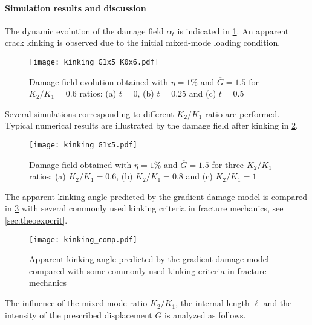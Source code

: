\paragraph{Simulation results and discussion} The dynamic evolution of the damage field $\alpha_t$ is indicated in \cref{fig:kinking_t}. An apparent crack kinking is observed due to the initial mixed-mode loading condition.
\begin{figure}[htbp]
\centering
\texttt{[image: kinking\_G1x5\_K0x6.pdf]}
\caption{Damage field evolution obtained with $\eta=1\%$ and $\overline{G}=1.5$ for $K_2/K_1=0.6$ ratios: (a) $t=0$, (b) $t=0.25$ and (c) $t=0.5$} \label{fig:kinking_t}
\end{figure}
Several simulations corresponding to different $K_2/K_1$ ratio are performed. Typical numerical results are illustrated by the damage field after kinking in \cref{fig:kinking_k2k1}.
\begin{figure}[htbp]
\centering
\texttt{[image: kinking\_G1x5.pdf]}
\caption{Damage field obtained with $\eta=1\%$ and $\overline{G}=1.5$ for three $K_2/K_1$ ratios: (a) $K_2/K_1=0.6$, (b) $K_2/K_1=0.8$ and (c) $K_2/K_1=1$} \label{fig:kinking_k2k1}
\end{figure}
The apparent kinking angle predicted by the gradient damage model is compared in \cref{fig:kinking_comp} with several commonly used kinking criteria in fracture mechanics, see \cref{sec:theoexpcrit}.
\begin{figure}[htbp]
\centering
\texttt{[image: kinking\_comp.pdf]}
\caption{Apparent kinking angle predicted by the gradient damage model compared with some commonly used kinking criteria in fracture mechanics} \label{fig:kinking_comp}
\end{figure}
The influence of the mixed-mode ratio $K_2/K_1$, the internal length $\ell$ and the intensity of the prescribed displacement $\overline{G}$ is analyzed as follows. 
